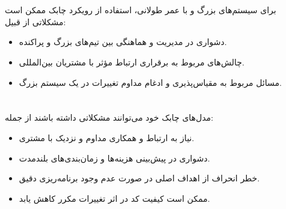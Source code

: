 \section*{}
برای سیستم‌های بزرگ و با عمر طولانی، استفاده از رویکرد چابک ممکن است مشکلاتی از قبیل:
\begin{itemize}
	\item دشواری در مدیریت و هماهنگی بین تیم‌های بزرگ و پراکنده.
	\item چالش‌های مربوط به برقراری ارتباط مؤثر با مشتریان بین‌المللی.
	\item مسائل مربوط به مقیاس‌پذیری و ادغام مداوم تغییرات در یک سیستم بزرگ.
\end{itemize}

\section*{}
مدل‌های چابک خود می‌توانند مشکلاتی داشته باشند از جمله:
\begin{itemize}
	\item نیاز به ارتباط و همکاری مداوم و نزدیک با مشتری.
	\item دشواری در پیش‌بینی هزینه‌ها و زمان‌بندی‌های بلندمدت.
	\item خطر انحراف از اهداف اصلی در صورت عدم وجود برنامه‌ریزی دقیق.
	\item ممکن است کیفیت کد در اثر تغییرات مکرر کاهش یابد.
\end{itemize}
